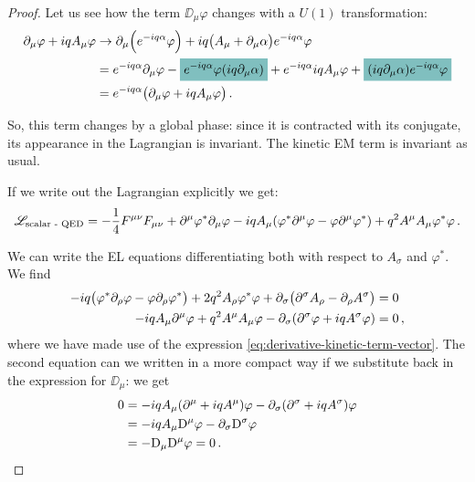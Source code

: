 \documentclass[main.tex]{subfiles}
\begin{document}

\begin{proof}
Let us see how the term \(\DD_{\mu } \varphi \) changes with a \(U(1)\) transformation: 
%
\begin{align}
\partial_{\mu } \varphi + i q A_{\mu } \varphi &\to 
\partial_{\mu } \qty(e^{-iq \alpha } \varphi )
+ i q \qty(A_{\mu } + \partial_{\mu }\alpha ) e^{-iq \alpha } \varphi  \\
&= e^{-iq \alpha } \partial_{\mu } \varphi 
- \hlc{teal}{e^{-iq \alpha } \varphi (iq \partial_{\mu } \alpha )} 
+e^{-iq \alpha } i q A_{\mu } \varphi 
+ \hlc{teal}{(iq \partial_{\mu }\alpha ) e^{-iq \alpha } \varphi}  \\
&= e^{-iq \alpha } \qty(\partial_{\mu } \varphi + i q A_{\mu } \varphi) 
\,.
\end{align}

So, this term changes by a global phase: since it is contracted with its conjugate, its appearance in the Lagrangian is invariant. 
The kinetic EM term is invariant as usual. 
    
If we write out the Lagrangian explicitly we get: 
%
\begin{align}
\mathscr{L}_{\text{scalar - QED}}
= - \frac{1}{4} F^{\mu \nu } F_{\mu \nu } 
+ \partial^{\mu } \varphi^{*} \partial_{\mu } \varphi 
- iq A_{\mu } \qty(\varphi^{*}\partial^{\mu } \varphi - \varphi \partial^{\mu } \varphi^{*})
+ q^2 A^{\mu }A_{\mu } \varphi^{*} \varphi 
\,.
\end{align}

We can write the EL equations differentiating both with respect to \(A_{\sigma }\) and \(\varphi^{*}\). We find 
%
\begin{align}
-iq \qty(\varphi^{*} \partial_{\rho } \varphi - \varphi \partial_{\rho } \varphi^{*})
+ 2 q^2 A_{\rho } \varphi^{*} \varphi 
+ \partial_{\sigma } \qty(\partial^{\sigma }A_{\rho } - \partial_\rho A^{\sigma })&= 0   \\
-iq A_{\mu } \partial^{\mu } \varphi 
+ q^2 A^{\mu } A_{\mu } \varphi 
- \partial_{\sigma } \qty(
\partial^{\sigma } \varphi 
+ i q A^{ \sigma } \varphi 
)
&=0 
\,,
\end{align}
%
where we have made use of the expression \eqref{eq:derivative-kinetic-term-vector}. 
The second equation can we written in a more compact way if we substitute back in the expression for \(\DD_{\mu }\): we get 
%
\begin{align}
0 &=
-i q A_{\mu } \qty(\partial^{\mu } + i q A^{\mu } ) \varphi 
- \partial_{\sigma } \qty(\partial^{ \sigma } + i q A^{\sigma }) \varphi   \\
&= -iq A_{\mu } \mathrm{D}^{\mu } \varphi 
- \partial_{\sigma } \mathrm{D}^{\sigma } \varphi  \\
&= - \mathrm{D}_{\mu } \mathrm{D}^{\mu } \varphi =0
\,.
\end{align}
\end{proof}
\end{document}
